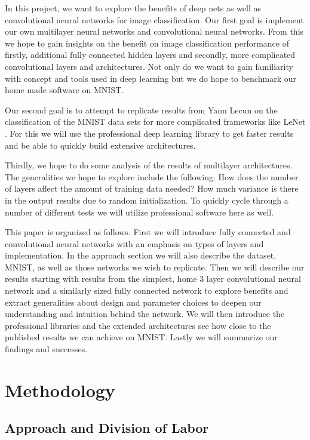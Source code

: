 \documentclass[12pt, twocolumn]{article}
\begin{document}
In this project, we want to explore the benefits of deep nets as well as convolutional neural networks for image classification.  Our first goal is implement our own multilayer neural networks and convolutional neural networks. From this we hope to gain insights on the benefit on image classification performance of firstly, additional fully connected hidden layers and secondly, more complicated convolutional layers and architectures.  Not only do we want to gain familiarity with concept and tools used in deep learning but we do hope to benchmark our home made software on MNIST. 

Our second goal is to attempt to replicate results from Yann Lecun on the classification of the MNIST data sets for more complicated frameworks like LeNet \cite{LeCun1998}. For this we will use the professional deep learning library to get faster results and be able to quickly build extensive architectures. 

Thirdly, we hope to do some analysis of the results of multilayer architectures. The generalities we hope to explore include the following: How does the number of layers affect the amount of training data needed?  How much variance is there in the output results due to random initialization.  To quickly cycle through a number of different tests we will utilize professional software here as well. 

This paper is organized as follows. First we will introduce fully connected and convolutional neural networks with an emphasis on types of layers and implementation. In the approach section we will also describe the dataset, MNIST, as well as those networks we wish to replicate.  Then we will describe our results starting with  results from the simplest, home  3 layer convolutional neural network and a similarly sized fully connected network to explore benefits and extract generalities about design and parameter choices to deepen our understanding and intuition behind the network. We will then introduce the professional libraries and the extended architectures see how close to the published results we can achieve on MNIST. Lastly we will summarize our findings and successes.

\section{Methodology}

\subsection{Approach and Division of Labor}
	
\end{document}
